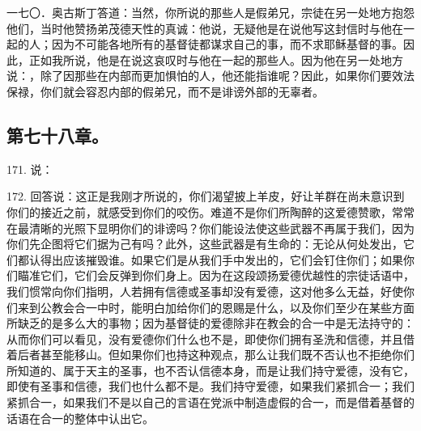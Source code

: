 一七〇．奥古斯丁答道：当然，你所说的那些人是假弟兄，宗徒在另一处地方抱怨他们，当时他赞扬弟茂德天性的真诚：他说，无疑他是在说他写这封信时与他在一起的人；因为不可能各地所有的基督徒都谋求自己的事，而不求耶稣基督的事。因此，正如我所说，他是在说这哀叹时与他在一起的那些人。因为他在另一处地方说：，除了因那些在内部而更加惧怕的人，他还能指谁呢？因此，如果你们要效法保禄，你们就会容忍内部的假弟兄，而不是诽谤外部的无辜者。\par


\subsection{第七十八章。}

171. 说：\par

172. 回答说：这正是我刚才所说的，你们渴望披上羊皮，好让羊群在尚未意识到你们的接近之前，就感受到你们的咬伤。难道不是你们所陶醉的这爱德赞歌，常常在最清晰的光照下显明你们的诽谤吗？你们能设法使这些武器不再属于我们，因为你们先企图将它们据为己有吗？此外，这些武器是有生命的：无论从何处发出，它们都认得出应该摧毁谁。如果它们是从我们手中发出的，它们会钉住你们；如果你们瞄准它们，它们会反弹到你们身上。因为在这段颂扬爱德优越性的宗徒话语中，我们惯常向你们指明，人若拥有信德或圣事却没有爱德，这对他多么无益，好使你们来到公教会合一中时，能明白加给你们的恩赐是什么，以及你们至少在某些方面所缺乏的是多么大的事物；因为基督徒的爱德除非在教会的合一中是无法持守的：从而你们可以看见，没有爱德你们什么也不是，即使你们拥有圣洗和信德，并且借着后者甚至能移山。但如果你们也持这种观点，那么让我们既不否认也不拒绝你们所知道的、属于天主的圣事，也不否认信德本身，而是让我们持守爱德，没有它，即使有圣事和信德，我们也什么都不是。我们持守爱德，如果我们紧抓合一；我们紧抓合一，如果我们不是以自己的言语在党派中制造虚假的合一，而是借着基督的话语在合一的整体中认出它。\par


